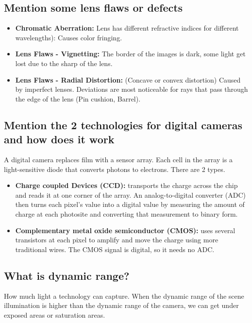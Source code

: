 \documentclass{article}
\begin{document}
\subsection{Mention some lens flaws or defects}
\begin{itemize}
    \item \textbf{Chromatic Aberration:} Lens has different refractive indices for
    different wavelengths): Causes color fringing.
    \item \textbf{Lens Flaws - Vignetting:} The border of the images is dark, some light get lost
    due to the sharp of the lens.
    \item \textbf{Lens Flaws - Radial Distortion:} (Concave or convex distortion)
    Caused by imperfect lenses. Deviations are most noticeable for rays that pass through the
    edge of the lens (Pin cushion, Barrel).
\end{itemize}

\subsection{Mention the 2 technologies for digital cameras and how does it work}
A digital camera replaces film with a sensor array. Each cell in the array is a light-sensitive
diode that converts photons to electrons. There are 2 types.
\begin{itemize}
    \item \textbf{Charge coupled Devices (CCD):} transports the charge across the chip and reads
    it at one corner of the array. An analog-to-digital converter (ADC) then turns each pixel's
    value into a digital value by measuring the amount of charge at each photosite and converting
    that measurement to binary form.
    \item \textbf{Complementary metal oxide semiconductor (CMOS):} uses several transistors at
    each pixel to amplify and move the charge using more traditional wires. The CMOS signal is
    digital, so it needs no ADC.
\end{itemize}

\subsection{What is dynamic range?}
How much light a technology can capture. When the dynamic range of the scene illumination
is higher than the dynamic range of the camera, we can get under exposed areas or saturation areas.
\end{document}
